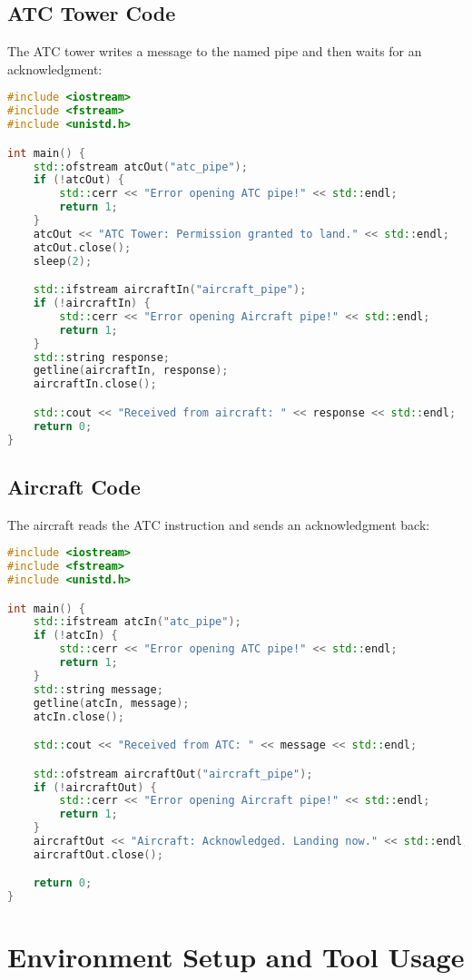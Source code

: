 \documentclass[12pt, onecolumn]{IEEEtran}
\begin{document}
\subsection{ATC Tower Code}
The ATC tower writes a message to the named pipe and then waits for an acknowledgment:
\begin{lstlisting}[language=C++, caption=ATC Tower Sending Message]
#include <iostream>
#include <fstream>
#include <unistd.h>

int main() {
    std::ofstream atcOut("atc_pipe");
    if (!atcOut) {
        std::cerr << "Error opening ATC pipe!" << std::endl;
        return 1;
    }
    atcOut << "ATC Tower: Permission granted to land." << std::endl;
    atcOut.close();
    sleep(2);

    std::ifstream aircraftIn("aircraft_pipe");
    if (!aircraftIn) {
        std::cerr << "Error opening Aircraft pipe!" << std::endl;
        return 1;
    }
    std::string response;
    getline(aircraftIn, response);
    aircraftIn.close();

    std::cout << "Received from aircraft: " << response << std::endl;
    return 0;
}
\end{lstlisting}

\subsection{Aircraft Code}
The aircraft reads the ATC instruction and sends an acknowledgment back:
\begin{lstlisting}[language=C++, caption=Aircraft Receiving and Responding]
#include <iostream>
#include <fstream>
#include <unistd.h>

int main() {
    std::ifstream atcIn("atc_pipe");
    if (!atcIn) {
        std::cerr << "Error opening ATC pipe!" << std::endl;
        return 1;
    }
    std::string message;
    getline(atcIn, message);
    atcIn.close();

    std::cout << "Received from ATC: " << message << std::endl;

    std::ofstream aircraftOut("aircraft_pipe");
    if (!aircraftOut) {
        std::cerr << "Error opening Aircraft pipe!" << std::endl;
        return 1;
    }
    aircraftOut << "Aircraft: Acknowledged. Landing now." << std::endl;
    aircraftOut.close();

    return 0;
}
\end{lstlisting}

\section{Environment Setup and Tool Usage}
\end{document}
